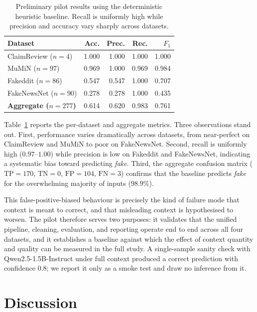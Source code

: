 \documentclass[11pt]{article}
\begin{document}
\begin{table}[t]
\centering
\small
\begin{tabular}{@{}lrrrr@{}}
\toprule
\textbf{Dataset} & \textbf{Acc.} & \textbf{Prec.} & \textbf{Rec.} & \textbf{$F_1$} \\
\midrule
ClaimReview ($n{=}4$)   & 1.000 & 1.000 & 1.000 & 1.000 \\
MuMiN ($n{=}97$)        & 0.969 & 1.000 & 0.969 & 0.984 \\
Fakeddit ($n{=}86$)     & 0.547 & 0.547 & 1.000 & 0.707 \\
FakeNewsNet ($n{=}90$)  & 0.278 & 0.278 & 1.000 & 0.435 \\
\midrule
\textbf{Aggregate ($n{=}277$)} & 0.614 & 0.620 & 0.983 & 0.761 \\
\bottomrule
\end{tabular}
\caption{Preliminary pilot results using the deterministic heuristic baseline. Recall is uniformly high while precision and accuracy vary sharply across datasets.}
\label{tab:pilot}
\end{table}

Table~\ref{tab:pilot} reports the per-dataset and aggregate metrics. Three observations stand out. First, performance varies dramatically across datasets, from near-perfect on ClaimReview and MuMiN to poor on FakeNewsNet. Second, recall is uniformly high ($0.97$--$1.00$) while precision is low on Fakeddit and FakeNewsNet, indicating a systematic bias toward predicting \emph{fake}. Third, the aggregate confusion matrix ($\text{TP}=170$, $\text{TN}=0$, $\text{FP}=104$, $\text{FN}=3$) confirms that the baseline predicts \emph{fake} for the overwhelming majority of inputs ($98.9\%$).

This false-positive-biased behaviour is precisely the kind of failure mode that context is meant to correct, and that misleading context is hypothesised to worsen. The pilot therefore serves two purposes: it validates that the unified pipeline, cleaning, evaluation, and reporting operate end to end across all four datasets, and it establishes a baseline against which the effect of context quantity and quality can be measured in the full study. A single-sample sanity check with Qwen2.5-1.5B-Instruct under full context produced a correct prediction with confidence $0.8$; we report it only as a smoke test and draw no inference from it.

\section{Discussion}
\label{sec:discussion}
\end{document}
